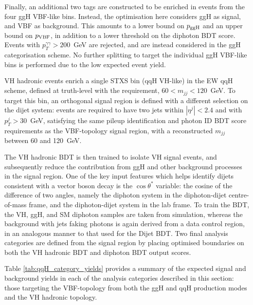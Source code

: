 Finally, an additional two tags are constructed to be enriched in events from the four ggH VBF-like bins. Instead, the optimisation here considers ggH as signal, and VBF as background. This amounts to a lower bound on $p_{\rm{ggH}}$ and an upper bound on $p_{\rm{VBF}}$, in addition to a lower threshold on the diphoton BDT score. Events with $p_T^{\gamma\gamma}>200$~GeV are rejected, and are instead considered in the ggH categorisation scheme. No further splitting to target the individual ggH VBF-like bins is performed due to the low expected event yield. 

VH hadronic events enrich a single STXS bin (qqH VH-like) in the EW qqH scheme, defined at truth-level with the requirement, $60<m_{jj}<120$~GeV. To target this bin, an orthogonal signal region is defined with a different selection on the dijet system: events are required to have two jets within $|\eta^j|<2.4$ and with $p_T^j>30$~GeV, satisfying the same pileup identification and photon ID BDT score requirements as the VBF-topology signal region, with a reconstructed $m_{jj}$ between 60 and 120~GeV. 

The VH hadronic BDT is then trained to isolate VH signal events, and subsequently reduce the contribution from ggH and other background processes in the signal region. One of the key input features which helps identify dijets consistent with a vector boson decay is the $\cos{\theta^*}$ variable: the cosine of the difference of two angles, namely the diphoton system in the diphoton-dijet centre-of-mass frame, and the diphoton-dijet system in the lab frame. To train the BDT, the VH, ggH, and SM diphoton samples are taken from simulation, whereas the background with jets faking photons is again derived from a data control region, in an analogous manner to that used for the Dijet BDT. Two final analysis categories are defined from the signal region by placing optimised boundaries on both the VH hadronic BDT and diphoton BDT output scores.

Table \ref{tab:qqH_category_yields} provides a summary of the expected signal and background yields in each of the analysis categories described in this section: those targeting the VBF-topology from both the ggH and qqH production modes and the VH hadronic topology.

